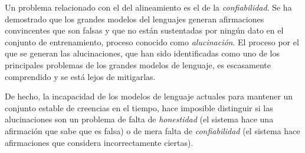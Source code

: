 Un problema relacionado con el del alineamiento es el de la \textit{confiabilidad}. Se ha demostrado que los grandes modelos del lenguajes generan afirmaciones convincentes que son falsas y que no están sustentadas por ningún dato en el conjunto de entrenamiento, proceso conocido como \textit{alucinación}. El proceso por el que se generan las alucinaciones, que han sido identificadas como uno de los principales problemas de los grandes modelos de lenguaje, es escasamente comprendido y se está lejos de mitigarlas.

De hecho, la incapacidad de los modelos de lenguaje actuales para mantener un conjunto estable de creencias en el tiempo, hace imposible distinguir si las alucinaciones son un problema de falta de   \textit{honestidad} (el sistema hace una afirmación que sabe que es falsa) o de mera falta de \textit{confiabilidad} (el sistema hace afirmaciones que considera incorrectamente ciertas).